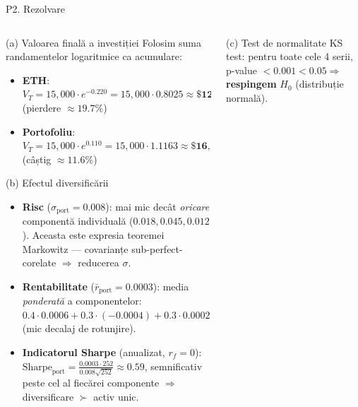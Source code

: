 \documentclass[9pt, aspectratio=169, t]{beamer}
\begin{document}
\begin{frame}[shrink=25]{P2. Rezolvare}
\begin{columns}[T]
\begin{column}{0.5\textwidth}
\begin{block}{(a) Valoarea finală a investiției}
Folosim suma randamentelor logaritmice ca acumulare:
\begin{itemize}\setlength{\itemsep}{1pt}
\item \textbf{ETH}: $V_T = 15{,}000\cdot e^{-0.220} = 15{,}000\cdot 0.8025 \approx \mathbf{\$12{,}038}$ \\(pierdere $\approx 19.7\%$)
\item \textbf{Portofoliu}: $V_T = 15{,}000\cdot e^{0.110} = 15{,}000\cdot 1.1163 \approx \mathbf{\$16{,}745}$ \\(câștig $\approx 11.6\%$)
\end{itemize}
\end{block}
\begin{block}{(b) Efectul diversificării}
\begin{itemize}\setlength{\itemsep}{1pt}
\item \textbf{Risc} ($\sigma_{\text{port}}=0.008$): mai mic decât \emph{oricare} componentă individuală ($0.018, 0.045, 0.012$). Aceasta este expresia teoremei Markowitz --- covarianțe sub-perfect-corelate $\Rightarrow$ reducerea $\sigma$.
\item \textbf{Rentabilitate} ($\bar r_{\text{port}}=0.0003$): media \emph{ponderată} a componentelor: $0.4\cdot 0.0006+0.3\cdot(-0.0004)+0.3\cdot 0.0002 = 0.00018\approx 0.0002$ (mic decalaj de rotunjire).
\item \textbf{Indicatorul Sharpe} (anualizat, $r_f=0$): $\text{Sharpe}_{\text{port}}=\frac{0.0003\cdot 252}{0.008\sqrt{252}} \approx 0.59$, semnificativ peste cel al fiecărei componente $\Rightarrow$ diversificare $\succ$ activ unic.
\end{itemize}
\end{block}
\end{column}
\begin{column}{0.48\textwidth}
\begin{block}{(c) Test de normalitate}
KS test: pentru toate cele 4 serii, p-value $<0.001 < 0.05 \Rightarrow$ \textbf{respingem} $H_0$ (distribuție normală).


\end{block}
\end{column}
\end{columns}
\end{frame}
\end{document}
